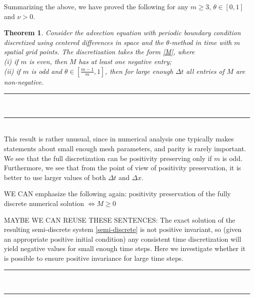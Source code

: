 \documentclass[a4paper]{article}
\newtheorem{theorem}{Theorem}
\newcommand{\dt}{\Delta t}
\newcommand{\dx}{\Delta x}
\newcommand{\te}{\theta}
\begin{document}
\begin{description}[style=unboxed,leftmargin=0cm]
Summarizing the above, we have proved the following for any $m\ge 3$, $\te\in[0,1]$ and
$\nu>0$.
\end{description}
\begin{theorem}\label{thm1}
Consider the advection equation with periodic boundary condition discretized using centered
differences in space and the $\theta$-method in time with $m$ spatial grid points.  
The discretization takes the form \eqref{M},
where\\
(i) if $m$ is even, then $M$ has at least one negative entry;\\
(ii) if $m$ is odd and $\theta\in\left[\frac{m-1}{m},1\right]$, then for large enough $\dt$ all
entries of $M$ are non-negative.
\end{theorem}

\noindent\rule{10cm}{0.4pt}\\
\noindent\rule{10cm}{0.4pt}\\
This result is rather unusual, since in numerical analysis one typically makes
statements about small enough mesh parameters, and parity is rarely important.
We see that the full discretization can be positivity preserving only if $m$ is
odd.  Furthermore, we see that from the point of view of positivity preservation,
it is better to use larger values of both $\dt$ and $\dx$.


WE CAN emphasize the following again: positivity preservation of the fully discrete numerical solution  
$\Longleftrightarrow  M\ge 0$

MAYBE WE CAN REUSE THESE SENTENCES:
The exact solution of the resulting semi-discrete
system \eqref{semi-discrete} is not positive invariant, so (given an appropriate
positive initial condition) any consistent time discretization will yield
negative values for small enough time steps.  Here we investigate whether
it is possible to ensure positive invariance for large time steps.\\
\noindent\rule{10cm}{0.4pt}\\
\noindent\rule{10cm}{0.4pt}
\end{document}
